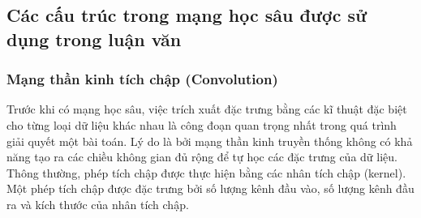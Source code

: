 
\subsection{\texorpdfstring{Các cấu trúc trong mạng học sâu được sử dụng trong luận văn}{dl_basic_structures}}

\subsubsection{Mạng thần kinh tích chập (Convolution)}
Trước khi có mạng học sâu, việc trích xuất đặc trưng bằng các kĩ thuật đặc biệt cho từng loại dữ liệu khác nhau là công đoạn quan trọng nhất trong quá trình giải quyết một bài toán. Lý do là bởi mạng thần kinh truyền thống không có khả năng tạo ra các chiều không gian đủ rộng để tự học các đặc trưng của dữ liệu. Thông thường, phép tích chập được thực hiện bằng các nhân tích chập (kernel). Một phép tích chập được đặc trưng bởi số lượng kênh đầu vào, số lượng kênh đầu ra và kích thước của nhân tích chập.


